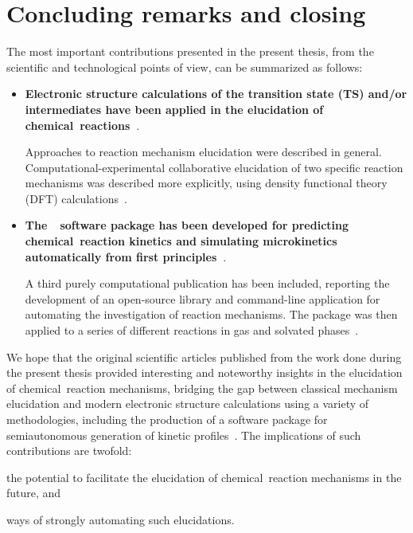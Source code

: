\chapter{Concluding remarks and closing}%
\label{ch:conclusion}


The most important contributions presented in the present thesis,
from the scientific and technological points of view, can be summarized as follows:

\begin{itemize}
	\item \textbf{Electronic structure calculations of the transition state (TS)
		      and/or intermediates have been applied
		      in the elucidation of chemical~reactions~\cite{Coelho_2019,Oliveira_2020}}.

	      Approaches to reaction mechanism elucidation were described in general.
	      \linebreak
	      Computational-experimental collaborative elucidation of two specific reaction mechanisms was described more explicitly,
	      using density functional theory (DFT) calculations~\cite{Coelho_2019,Oliveira_2020}.

	\item \textbf{The~\overreact{}~software package has been developed for predicting chemical~reaction kinetics
		      and simulating microkinetics automatically from first principles~\cite{Schneider_2022}}.

	      A third purely computational publication has been included,
	      reporting the development of an open-source library
	      and command-line application for automating the investigation
	      of reaction mechanisms.
	      The package was then applied to a series of different reactions
	      in gas and solvated phases~\cite{Schneider_2022}.
\end{itemize}


We hope that the original scientific articles published from the work done
during the present thesis provided
interesting and noteworthy insights in the elucidation of chemical~reaction mechanisms,
bridging the gap between classical mechanism elucidation
and modern electronic structure calculations using a variety of methodologies,
including the production of a software package for semiautonomous generation
of kinetic profiles~\cite{Schneider_2022}.
The implications of such contributions are twofold:
%
\begin{itemize*}
	\item the potential to facilitate the elucidation of chemical~reaction mechanisms in the future, and
	\item ways of strongly automating such elucidations.
\end{itemize*}

